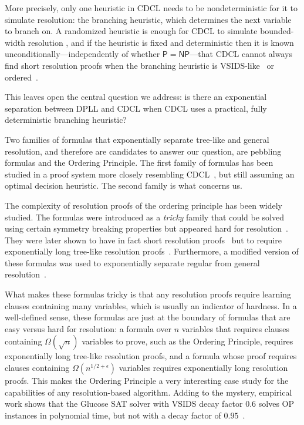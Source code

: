 \documentclass[a4paper,UKenglish,cleveref, autoref, thm-restate]{lipics-v2021}
\begin{document}
More precisely, only one heuristic in CDCL needs to be nondeterministic for it to simulate resolution: the branching heuristic, which determines the next variable to branch on. A randomized heuristic is enough for CDCL to simulate bounded-width resolution \cite{manyrestarts}, and if the heuristic is fixed and deterministic then it is known unconditionally---independently of whether $\mathsf{P}=\mathsf{NP}$---that CDCL cannot always find short resolution proofs when the branching heuristic is VSIDS-like~\cite{pitfall} or ordered~\cite{DBLP:journals/siamcomp/MullPR22}.

This leaves open the central question we address: is there an exponential separation between DPLL and CDCL when CDCL uses a practical, fully deterministic branching heuristic?

Two families of formulas that exponentially separate tree-like and general resolution, and therefore are candidates to answer our question, are pebbling formulas and the Ordering Principle. The first family of formulas has been studied in a proof system more closely resembling CDCL~\cite{elffers2016trade}, but still assuming an optimal decision heuristic. The second family is what concerns us.

The complexity of resolution proofs of the ordering principle has been widely studied. The formulas were introduced as a \emph{tricky} family that could be solved using certain symmetry breaking properties but appeared hard for resolution~\cite{krishnamurthy1985short}. They were later shown to have in fact short resolution proofs~\cite{staalmarck1996short} but to require exponentially long tree-like resolution proofs~\cite{bonet-galesi}. Furthermore, a modified version of these formulas was used to exponentially separate regular from general resolution~\cite{alekhnovich2007exponential}.

What makes these formulas tricky is that any resolution proofs require learning clauses containing many variables, which is usually an indicator of hardness. In a well-defined sense, these formulas are just at the boundary of formulas that are easy versus hard for resolution: a formula over $n$ variables that requires clauses containing $\Omega(\sqrt{n})$ variables to prove, such as the Ordering Principle, requires exponentially long tree-like resolution proofs, and a formula whose proof requires clauses containing $\Omega(n^{1/2+\epsilon})$ variables requires exponentially long resolution proofs. This makes the Ordering Principle a very interesting case study for the capabilities of any resolution-based algorithm. Adding to the mystery, empirical work shows that the Glucose SAT solver with VSIDS decay factor $0.6$ solves OP instances in polynomial time, but not with a decay factor of $0.95$~\cite{elffers2018seeking}.
\end{document}
